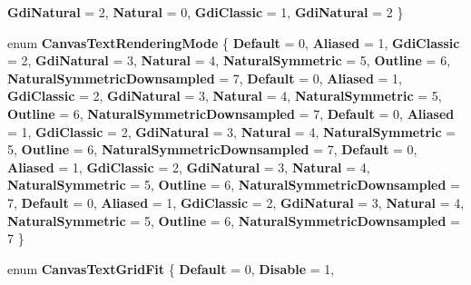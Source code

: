 \begin{DoxyCompactItemize}
{\bfseries Gdi\+Natural} = 2, 
\newline
{\bfseries Natural} = 0, 
{\bfseries Gdi\+Classic} = 1, 
{\bfseries Gdi\+Natural} = 2
 \}
\item 
\mbox{\label{namespace_microsoft_1_1_graphics_1_1_canvas_1_1_text_a334e63f588579a4be3880313d6dabd2d}} 
enum {\bfseries Canvas\+Text\+Rendering\+Mode} \{ \newline
{\bfseries Default} = 0, 
{\bfseries Aliased} = 1, 
{\bfseries Gdi\+Classic} = 2, 
{\bfseries Gdi\+Natural} = 3, 
\newline
{\bfseries Natural} = 4, 
{\bfseries Natural\+Symmetric} = 5, 
{\bfseries Outline} = 6, 
{\bfseries Natural\+Symmetric\+Downsampled} = 7, 
\newline
{\bfseries Default} = 0, 
{\bfseries Aliased} = 1, 
{\bfseries Gdi\+Classic} = 2, 
{\bfseries Gdi\+Natural} = 3, 
\newline
{\bfseries Natural} = 4, 
{\bfseries Natural\+Symmetric} = 5, 
{\bfseries Outline} = 6, 
{\bfseries Natural\+Symmetric\+Downsampled} = 7, 
\newline
{\bfseries Default} = 0, 
{\bfseries Aliased} = 1, 
{\bfseries Gdi\+Classic} = 2, 
{\bfseries Gdi\+Natural} = 3, 
\newline
{\bfseries Natural} = 4, 
{\bfseries Natural\+Symmetric} = 5, 
{\bfseries Outline} = 6, 
{\bfseries Natural\+Symmetric\+Downsampled} = 7, 
\newline
{\bfseries Default} = 0, 
{\bfseries Aliased} = 1, 
{\bfseries Gdi\+Classic} = 2, 
{\bfseries Gdi\+Natural} = 3, 
\newline
{\bfseries Natural} = 4, 
{\bfseries Natural\+Symmetric} = 5, 
{\bfseries Outline} = 6, 
{\bfseries Natural\+Symmetric\+Downsampled} = 7, 
\newline
{\bfseries Default} = 0, 
{\bfseries Aliased} = 1, 
{\bfseries Gdi\+Classic} = 2, 
{\bfseries Gdi\+Natural} = 3, 
\newline
{\bfseries Natural} = 4, 
{\bfseries Natural\+Symmetric} = 5, 
{\bfseries Outline} = 6, 
{\bfseries Natural\+Symmetric\+Downsampled} = 7
 \}
\item 
\mbox{\label{namespace_microsoft_1_1_graphics_1_1_canvas_1_1_text_a7077d2f1ea9a72f9af3d69e5f5e04c20}} 
enum {\bfseries Canvas\+Text\+Grid\+Fit} \{ \newline
{\bfseries Default} = 0, 
{\bfseries Disable} = 1, 

\end{DoxyCompactItemize}
